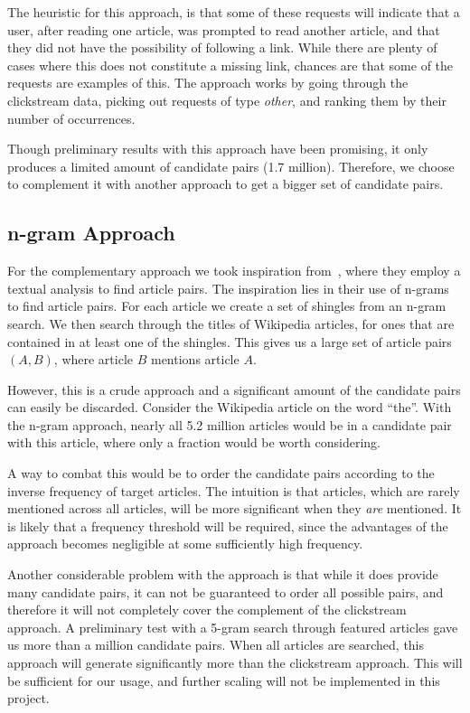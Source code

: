 The heuristic for this approach, is that some of these requests will indicate that a user, after reading one article, was prompted to read another article, and that they did not have the possibility of following a link. While there are plenty of cases where this does not constitute a missing link, chances are that some of the requests are examples of this. The approach works by going through the clickstream data, picking out requests of type \emph{other}, and ranking them by their number of occurrences.

Though preliminary results with this approach have been promising, it only produces a limited amount of candidate pairs (1.7 million). Therefore, we choose to complement it with another approach to get a bigger set of candidate pairs.

\subsection{n-gram Approach}

For the complementary approach we took inspiration from~\cite{milne2008learning}, where they employ a textual analysis to find article pairs. The inspiration lies in their use of n-grams to find article pairs. For each article we create a set of shingles from an n-gram search. We then search through the titles of Wikipedia articles, for ones that are contained in at least one of the shingles. This gives us a large set of article pairs $(A,B)$, where article $B$ mentions article $A$.

However, this is a crude approach and a significant amount of the candidate pairs can easily be discarded. Consider the Wikipedia article on the word \enquote{the}. With the n-gram approach, nearly all 5.2 million articles would be in a candidate pair with this article, where only a fraction would be worth considering.

A way to combat this would be to order the candidate pairs according to the inverse frequency of target articles. The intuition is that articles, which are rarely mentioned across all articles, will be more significant when they \emph{are} mentioned. It is likely that a frequency threshold will be required, since the advantages of the approach becomes negligible at some sufficiently high frequency.

Another considerable problem with the approach is that while it does provide many candidate pairs, it can not be guaranteed to order all possible pairs, and therefore it will not completely cover the complement of the clickstream approach. A preliminary test with a 5-gram search through featured articles gave us more than a million candidate pairs. When all articles are searched, this approach will generate significantly more than the clickstream approach. This will be sufficient for our usage, and further scaling will not be implemented in this project.


